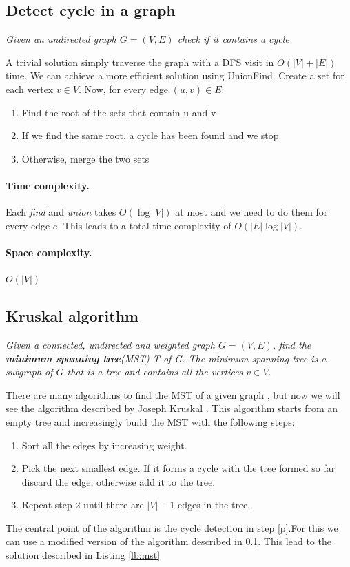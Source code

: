 \documentclass{article}
\begin{document}
\subsection{Detect cycle in a graph} \label{loop}
\emph{Given an undirected graph $G = (V, E)$ check if it contains a cycle}

\bigskip

A trivial solution simply traverse the graph with a DFS visit in $O(|V| + |E|)$
time. We can achieve a more efficient solution using UnionFind. Create a set for each
vertex $v \in V$. Now, for every edge $ (u,v) \in E$:\begin{enumerate}
    \item Find the root  of the sets that contain u and v
    \item If we find  the same root, a cycle has been found and we stop 
    \item Otherwise, merge the two sets
\end{enumerate}

\paragraph{Time complexity.} Each \emph{find} and \emph{union} takes $O(\log|V|)$
at most and we need to do them for every edge $e$. This leads to a total time complexity
of $O(|E|\log|V|)$.
\paragraph{Space complexity.} $O(|V|)$

\subsection{Kruskal algorithm}
\emph{Given a connected, undirected  and weighted  graph $G = (V,E)$,
find  the \textbf{minimum spanning tree}(MST) T  of G. The minimum spanning tree 
is a subgraph of $G$ that is a tree and contains all the vertices $v \in V$}.
    
\bigskip


There are many algorithms to find the MST of a given graph \cite{prim1957shortest} \cite{nevsetvril2001otakar},
but now we will see the algorithm described by Joseph Kruskal \cite{kruskal1956shortest}.
This algorithm starts from an empty tree and increasingly build the MST with the following steps:
\begin{enumerate}
    \item Sort all the edges by increasing weight.
    \item \label{p}Pick the next smallest edge. If it forms a cycle with the  tree formed so far discard the edge, otherwise
    add it to the tree.
    \item Repeat step 2 until there are $|V| - 1$ edges in the tree.
\end{enumerate}
The central point of the algorithm is the cycle detection in step \ref{p}.For this we can use a modified version of the algorithm described in \ref{loop}. This lead to the solution 
described in Listing \ref{lb:mst} 
\end{document}
